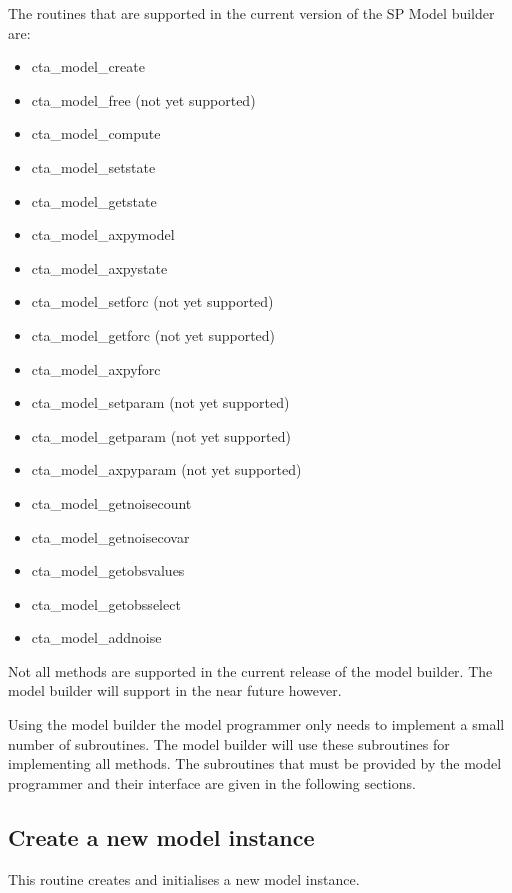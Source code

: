 The routines that are supported in the current version of the SP Model
builder are:
\begin{itemize}
\item cta\_model\_create
\item cta\_model\_free (not yet supported)
\item cta\_model\_compute
\item cta\_model\_setstate
\item cta\_model\_getstate
\item cta\_model\_axpymodel
\item cta\_model\_axpystate
\item cta\_model\_setforc   (not yet supported)
\item cta\_model\_getforc   (not yet supported)
\item cta\_model\_axpyforc
\item cta\_model\_setparam  (not yet supported)
\item cta\_model\_getparam  (not yet supported)
\item cta\_model\_axpyparam (not yet supported)
\item cta\_model\_getnoisecount
\item cta\_model\_getnoisecovar
\item cta\_model\_getobsvalues
\item cta\_model\_getobsselect
\item cta\_model\_addnoise 
\end{itemize}

Not all methods are supported in the current release of the model builder.
The model builder will support in the near future however.

Using the model builder the model programmer only needs to implement a small
number of subroutines. The model builder will use these subroutines for
implementing all methods. The subroutines that must be provided by the
model programmer and their interface are given in the following sections.

\subsection{Create a new model instance}
This routine creates and initialises a new model instance.

